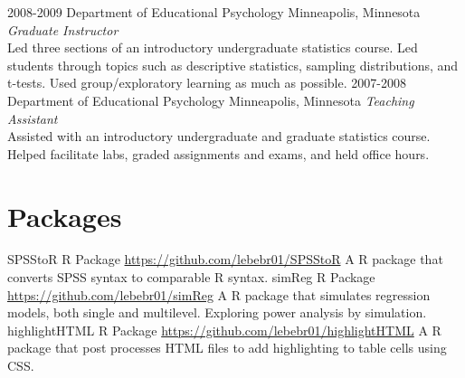 \documentclass[]{friggeri-cv} %
\begin{document}
\begin{entrylist}
\entry
{2008-2009}
{Department of Educational Psychology}
{Minneapolis, Minnesota}
{\emph{Graduate Instructor} \\
Led three sections of an introductory undergraduate statistics course. Led students through topics such as descriptive statistics, sampling distributions, and t-tests. Used group/exploratory learning as much as possible.}
\entry
{2007-2008}
{Department of Educational Psychology}
{Minneapolis, Minnesota}
{\emph{Teaching Assistant} \\
Assisted with an introductory undergraduate and graduate statistics course. Helped facilitate labs, graded assignments and exams, and held office hours.}
\end{entrylist}


\section{Packages}

\begin{entrylist}
\entry
{SPSStoR}
{R Package}
{\href{https://github.com/lebebr01/SPSStoR}{https://github.com/lebebr01/SPSStoR}}
{A R package that converts SPSS syntax to comparable R syntax.}
\entry
{simReg}
{R Package}
{\href{https://github.com/lebebr01/simReg}{https://github.com/lebebr01/simReg}}
{A R package that simulates regression models, both single and multilevel.
Exploring power analysis by simulation.}
\entry
{highlightHTML}
{R Package}
{\href{https://github.com/lebebr01/highlightHTML}{https://github.com/lebebr01/highlightHTML}}
{A R package that post processes HTML files to add highlighting to table cells using CSS.}
\end{entrylist}


\end{document}
